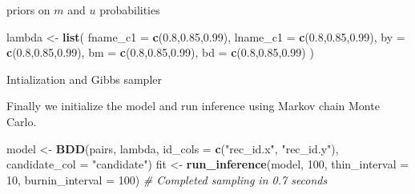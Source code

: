 \documentclass[
  ignorenonframetext,
]{beamer}
\newenvironment{Shaded}{\begin{snugshade}}{\end{snugshade}}
\newcommand{\CommentTok}[1]{\textcolor[rgb]{0.56,0.35,0.01}{\textit{#1}}}
\newcommand{\DataTypeTok}[1]{\textcolor[rgb]{0.13,0.29,0.53}{#1}}
\newcommand{\DecValTok}[1]{\textcolor[rgb]{0.00,0.00,0.81}{#1}}
\newcommand{\FloatTok}[1]{\textcolor[rgb]{0.00,0.00,0.81}{#1}}
\newcommand{\KeywordTok}[1]{\textcolor[rgb]{0.13,0.29,0.53}{\textbf{#1}}}
\newcommand{\NormalTok}[1]{#1}
\newcommand{\StringTok}[1]{\textcolor[rgb]{0.31,0.60,0.02}{#1}}
\begin{document}
\begin{frame}[fragile]{priors on \(m\) and \(u\) probabilities}
\protect\hypertarget{priors-on-m-and-u-probabilities-1}{}

\begin{Shaded}
\begin{Highlighting}[]
\NormalTok{lambda <-}\StringTok{ }\KeywordTok{list}\NormalTok{(}
  \DataTypeTok{fname_c1 =} \KeywordTok{c}\NormalTok{(}\FloatTok{0.8}\NormalTok{,}\FloatTok{0.85}\NormalTok{,}\FloatTok{0.99}\NormalTok{),}
  \DataTypeTok{lname_c1 =} \KeywordTok{c}\NormalTok{(}\FloatTok{0.8}\NormalTok{,}\FloatTok{0.85}\NormalTok{,}\FloatTok{0.99}\NormalTok{),}
  \DataTypeTok{by =} \KeywordTok{c}\NormalTok{(}\FloatTok{0.8}\NormalTok{,}\FloatTok{0.85}\NormalTok{,}\FloatTok{0.99}\NormalTok{),}
  \DataTypeTok{bm =} \KeywordTok{c}\NormalTok{(}\FloatTok{0.8}\NormalTok{,}\FloatTok{0.85}\NormalTok{,}\FloatTok{0.99}\NormalTok{),}
  \DataTypeTok{bd =} \KeywordTok{c}\NormalTok{(}\FloatTok{0.8}\NormalTok{,}\FloatTok{0.85}\NormalTok{,}\FloatTok{0.99}\NormalTok{)}
\NormalTok{)}
\end{Highlighting}
\end{Shaded}

\end{frame}

\begin{frame}[fragile]{Intialization and Gibbs sampler}
\protect\hypertarget{intialization-and-gibbs-sampler}{}

Finally we initialize the model and run inference using Markov chain
Monte Carlo.

\begin{Shaded}
\begin{Highlighting}[]
\NormalTok{model <-}\StringTok{ }\KeywordTok{BDD}\NormalTok{(pairs, lambda, }
             \DataTypeTok{id_cols =} \KeywordTok{c}\NormalTok{(}\StringTok{"rec_id.x"}\NormalTok{, }\StringTok{"rec_id.y"}\NormalTok{), }
             \DataTypeTok{candidate_col =} \StringTok{"candidate"}\NormalTok{)}
\NormalTok{fit <-}\StringTok{ }\KeywordTok{run_inference}\NormalTok{(model, }\DecValTok{100}\NormalTok{, }
                     \DataTypeTok{thin_interval =} \DecValTok{10}\NormalTok{, }
                     \DataTypeTok{burnin_interval =} \DecValTok{100}\NormalTok{)}
\CommentTok{# Completed sampling in 0.7 seconds}
\end{Highlighting}
\end{Shaded}

\end{frame}
\end{document}
